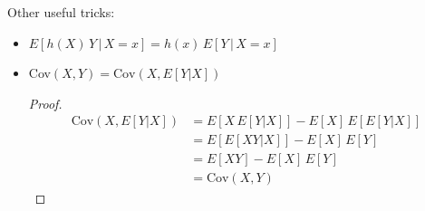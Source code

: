 Other useful tricks:
\begin{itemize}
    \item $E[h(X)\,Y\,|\,X=x] = h(x)\, E[Y\, | \, X=x]$
    \item Cov$(X,Y) = \text{Cov}(X,E[Y|X])$
    \begin{proof}
        \begin{equation*}
        \begin{split}
            \text{Cov}(X,E[Y|X]) & = E[X\,E[Y|X]]-E[X]\,E[E[Y|X]]\\
            & = E[E[XY|X]]-E[X]\,E[Y]\\
            & = E[XY]-E[X]\,E[Y]\\
            & = \text{Cov}(X,Y)
        \end{split}
        \end{equation*}
    \end{proof}
\end{itemize}

